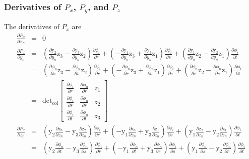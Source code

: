 \subsubsection{Derivatives of $P_x$, $P_y$, and $P_z$}

The derivatives of $P_x$ are
%
\begin{eqnarray}
\frac{\partial P_x}{\partial x_n} &=& 0 \nonumber\\
\frac{\partial P_x}{\partial y_n} &=& \left(\frac{\partial \text{y}_2}{\partial y_n} \text{z}_3 - \frac{\partial\text{y}_3}{\partial y_n} \text{z}_2\right) \frac{\partial \phi_i}{\partial r} + \left(-\frac{\partial\text{y}_1}{\partial y_n} \text{z}_3 + \frac{\partial \text{y}_3}{\partial y_n} \text{z}_1\right) \frac{\partial \phi_i}{\partial s} + \left(\frac{\partial \text{y}_1}{\partial y_n} \text{z}_2 - \frac{\partial \text{y}_2}{\partial y_n} \text{z}_1\right) \frac{\partial \phi_i}{\partial t} \nonumber\\
%
&=& \left(\frac{\partial \phi_n}{\partial s} \text{z}_3 - \frac{\partial \phi_n}{\partial t} \text{z}_2\right) \frac{\partial \phi_i}{\partial r} + \left(-\frac{\partial\phi_n}{\partial r} \text{z}_3 + \frac{\partial \phi_n}{\partial t} \text{z}_1\right) \frac{\partial \phi_i}{\partial s} + \left(\frac{\partial \phi_n}{\partial r} \text{z}_2 - \frac{\partial \phi_n}{\partial s} \text{z}_1\right) \frac{\partial \phi_i}{\partial t} \nonumber\\
%
&=& \text{det}_{\text{col}} \begin{bmatrix}
\frac{\partial \phi_i}{\partial r} & \frac{\partial \phi_n}{\partial r} & z_1 \\
\frac{\partial \phi_i}{\partial s} & \frac{\partial \phi_n}{\partial s} & z_2 \\
\frac{\partial \phi_i}{\partial t} & \frac{\partial \phi_n}{\partial t} & z_3 
\end{bmatrix}\nonumber\\
\frac{\partial P_x}{\partial z_n} &=& \left(\text{y}_2 \frac{\partial \text{z}_3}{\partial z_n} - \text{y}_3 \frac{\partial \text{z}_2}{\partial z_n} \right) \frac{\partial \phi_i}{\partial r} + \left(-\text{y}_1 \frac{\partial\text{z}_3}{\partial z_n} + \text{y}_3 \frac{\partial\text{z}_1}{\partial z_n}\right) \frac{\partial \phi_i}{\partial s} + \left(\text{y}_1 \frac{\partial \text{z}_2}{\partial z_n} - \text{y}_2 \frac{\partial \text{z}_1}{\partial z_n}\right) \frac{\partial \phi_i}{\partial t}  \nonumber\\
%
 &=& \left(\text{y}_2 \frac{\partial \phi_n}{\partial t} - \text{y}_3 \frac{\partial \phi_n}{\partial s} \right) \frac{\partial \phi_i}{\partial r} + \left(-\text{y}_1 \frac{\partial\phi_n}{\partial t} + \text{y}_3 \frac{\partial\phi_n}{\partial r}\right) \frac{\partial \phi_i}{\partial s} + \left(\text{y}_1 \frac{\partial \phi_n}{\partial s} - \text{y}_2 \frac{\partial \phi_n}{\partial r}\right) \frac{\partial \phi_i}{\partial t}  \nonumber\\

\end{eqnarray}

